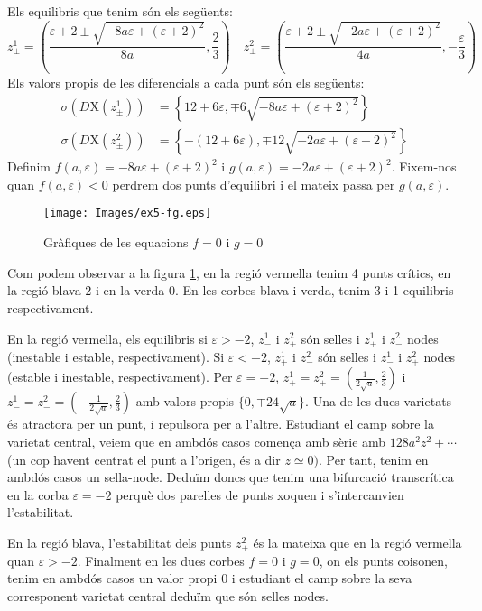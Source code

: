 \documentclass[a4paper]{article}
\newcommand{\vf}[1]{\boldsymbol{\mathrm{#1}}} %
\theoremstyle{definition}
\begin{document}
Els equilibris que tenim són els següents:
$$z_\pm^1= \left(\frac{\varepsilon+2\pm\sqrt{-8a\varepsilon+{(\varepsilon+2)}^2}}{8a},\frac{2}{3}\right) \quad z_\pm^2= \left(\frac{\varepsilon+2\pm\sqrt{-2a\varepsilon+{(\varepsilon+2)}^2}}{4a},-\frac{\varepsilon}{3}\right)$$
Els valors propis de les diferencials a cada punt són els següents:
\begin{align*}
  \sigma(D\vf{X}(z_\pm^1)) & =\left\{12+6\varepsilon, \mp6\sqrt{-8a\varepsilon+{(\varepsilon+2)}^2}\right\}     \\
  \sigma(D\vf{X}(z_\pm^2)) & =\left\{-(12+6\varepsilon), \mp12\sqrt{-2a\varepsilon+{(\varepsilon+2)}^2}\right\}
\end{align*}
Definim $f(a, \varepsilon)=-8a\varepsilon+{(\varepsilon+2)}^2$ i $g(a, \varepsilon) =-2a\varepsilon+{(\varepsilon+2)}^2$. Fixem-nos quan $f(a, \varepsilon)< 0$ perdrem dos punts d'equilibri i el mateix passa per $g(a,\varepsilon)$.
\begin{figure}[ht]
  \centering
  \texttt{[image: Images/ex5-fg.eps]}
  \caption{Gràfiques de les equacions $f=0$ i $g=0$}
  \label{ex5fg}
\end{figure}
Com podem observar a la figura \ref{ex5fg}, en la regió vermella tenim 4 punts crítics, en la regió blava 2 i en la verda 0. En les corbes blava i verda, tenim 3 i 1 equilibris respectivament.

En la regió vermella, els equilibris si $\varepsilon>-2$, $z_-^1$ i $z_+^2$ són selles i $z_+^1$ i $z_-^2$ nodes (inestable i estable, respectivament). Si $\varepsilon<-2$, $z_+^1$ i $z_-^2$ són selles i $z_-^1$ i $z_+^2$ nodes (estable i inestable, respectivament). Per $\varepsilon = -2$, $z_+^1=z_+^2=(\frac{1}{2\sqrt{a}},\frac{2}{3})$ i $z_-^1=z_-^2=(-\frac{1}{2\sqrt{a}},\frac{2}{3})$ amb valors propis $\{0,\mp 24\sqrt{a}\}$. Una de les dues varietats és atractora per un punt, i repulsora per a l'altre. Estudiant el camp sobre la varietat central, veiem que en ambdós casos comença amb sèrie amb $128a^2 z^2+\cdots$ (un cop havent centrat el punt a l'origen, és a dir $z\simeq 0)$. Per tant, tenim en ambdós casos un sella-node. Deduïm doncs que tenim una bifurcació transcrítica en la corba $\varepsilon = -2$ perquè dos parelles de punts xoquen i s'intercanvien l'estabilitat.

En la regió blava, l'estabilitat dels punts $z_\pm^2$ és la mateixa que en la regió vermella quan $\varepsilon > -2$. Finalment en les dues corbes $f=0$ i $g=0$, on els punts co\lgem isonen, tenim en ambdós casos un valor propi 0 i estudiant el camp sobre la seva corresponent varietat central deduïm que són selles nodes.
\end{document}
